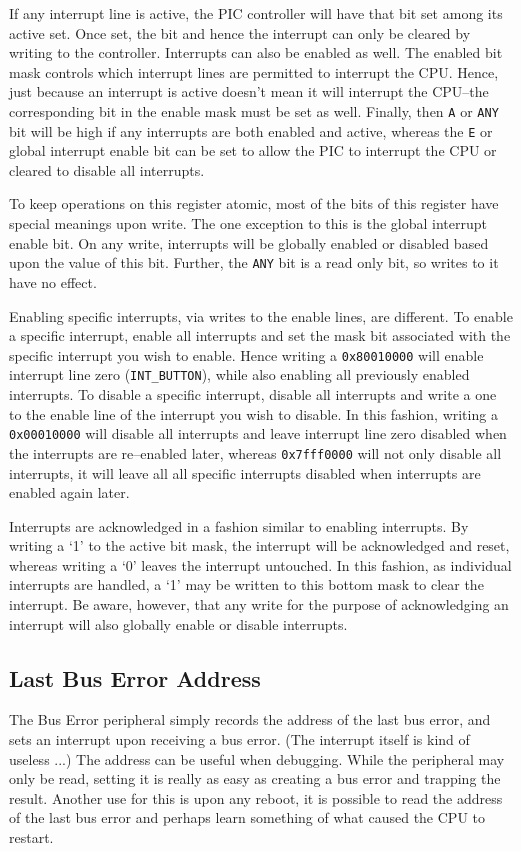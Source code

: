 \documentclass{gqtekspec}
\begin{document}
If any interrupt line is active, the PIC controller
will have that bit set among its active set.  Once set, the bit and hence the
interrupt can only be cleared by writing to the controller.  Interrupts can
also be enabled as well.  The enabled bit mask controls which interrupt lines
are permitted to interrupt the CPU. Hence, just because an interrupt is active
doesn't mean it will interrupt the CPU--the corresponding bit in the enable
mask must be set as well.
Finally, then {\tt A} or {\tt ANY} bit will be high if any interrupts are both
enabled and active, whereas the {\tt E} or global interrupt enable bit can be
set to allow the PIC to interrupt the CPU or cleared to disable all interrupts.

To keep operations on this register atomic, most of the bits of this register
have special meanings upon write.  The one exception to this is the global
interrupt enable bit.  On any write, interrupts will be globally enabled or
disabled based upon the value of this bit.  Further, the {\tt ANY} bit is a
read only bit, so writes to it have no effect.

Enabling specific interrupts, via writes to the enable lines, are different.
To enable a specific interrupt, enable all interrupts and
set the mask bit associated with the specific interrupt you wish to enable.
Hence writing a {\tt 0x80010000} will enable interrupt line zero
({\tt INT\_BUTTON}), while also enabling all previously enabled interrupts.
To disable a specific interrupt, disable all interrupts and write a one to the
enable line of the interrupt you wish to disable.  In this fashion, writing a
{\tt 0x00010000} will disable all interrupts and leave interrupt line zero
disabled when the interrupts are re--enabled later, whereas {\tt 0x7fff0000}
will not only disable all interrupts, it will leave all all specific interrupts
disabled when interrupts are enabled again later.

Interrupts are acknowledged in a fashion similar to enabling interrupts.  By
writing a `1' to the active bit mask, the interrupt will be acknowledged and
reset, whereas writing a `0' leaves the interrupt untouched.  In this fashion,
as individual interrupts are handled, a `1' may be written to this bottom mask
to clear the interrupt.  Be aware, however, that any write for the purpose of
acknowledging an interrupt will also globally enable or disable interrupts.

\subsection{Last Bus Error Address}
The Bus Error peripheral simply records the address of the last bus error,
and sets an interrupt upon receiving a bus error.  (The interrupt itself
is kind of useless ...) The address can be useful when debugging.  While the
peripheral may only be read,
setting it is really as easy as creating a bus error and trapping the result.
Another use for this is upon any reboot, it is possible to read the address
of the last bus error and perhaps learn something of what caused the CPU to
restart.
\end{document}
